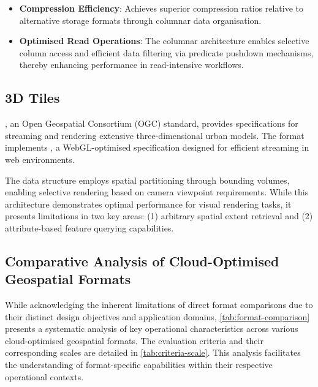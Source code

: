 \begin{itemize}
  \item \textbf{Compression Efficiency}: Achieves superior compression ratios relative to alternative storage formats through columnar data organisation.
  \item \textbf{Optimised Read Operations}: The columnar architecture enables selective column access and efficient data filtering via predicate pushdown mechanisms, thereby enhancing performance in read-intensive workflows.
\end{itemize}

\subsection{3D Tiles}
\label{rw:cloud_optimised_implementations:3d_tiles}
\citet{3d_tiles}, an Open Geospatial Consortium (OGC) standard, provides specifications for streaming and rendering extensive three-dimensional urban models. The format implements \citet{gltf}, a WebGL-optimised specification designed for efficient streaming in web environments.

The data structure employs spatial partitioning through bounding volumes, enabling selective rendering based on camera viewpoint requirements. While this architecture demonstrates optimal performance for visual rendering tasks, it presents limitations in two key areas: (1) arbitrary spatial extent retrieval and (2) attribute-based feature querying capabilities.

\subsection{Comparative Analysis of Cloud-Optimised Geospatial Formats}
\label{rw:cloud_optimised_implementations:comparison}
While acknowledging the inherent limitations of direct format comparisons due to their distinct design objectives and application domains, \autoref{tab:format-comparison} presents a systematic analysis of key operational characteristics across various cloud-optimised geospatial formats. The evaluation criteria and their corresponding scales are detailed in \autoref{tab:criteria-scale}. This analysis facilitates the understanding of format-specific capabilities within their respective operational contexts.

